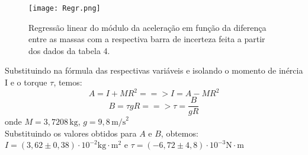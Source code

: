 \documentclass[a4papper, 10pt]{article}
\begin{document}
\begin{figure}[H]
    \centering
    \begin{minipage}[b]{0.9\textwidth}
        \texttt{[image: Regr.png]}
    \end{minipage}
        \caption{Regressão linear do módulo da aceleração em função da diferença entre as massas com a respectiva barra de incerteza feita a partir dos dados da tabela 4.}
        \label{fig:imagem1}  
\end{figure}

Substituindo na fórmula das respectivas variáveis e isolando o momento de inércia I e o torque $\tau$, temos:
\[
A = I + MR^2 ==> I = A - MR^2
\]
\[
B = \tau g R ==> \tau = \frac{B}{gR}
\]
onde $M = 3,7208 \, \text{kg}$, $g = 9,8 \, \text{m/s}^2$ 
\\
Substituindo os valores obtidos para \( A \) e \( B \), obtemos: 
$I = (3,62 \pm 0,38) \cdot 10^{-2}\text{kg} \cdot \text{m}^2$ e 
$\tau = (- 6,72 \pm 4,8)\cdot10^{-3}\text{N} \cdot \text{m}$
\\
\end{document}
